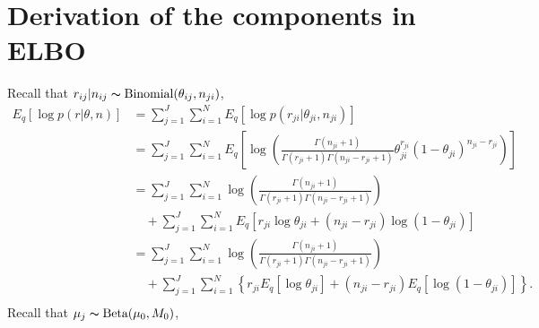 \documentclass[11pt,reqno]{amsart}
\begin{document}
\section{Derivation of the components in ELBO}
\label{appendix:ELBO}
Recall that $r_{ij}|n_{ij}\thicksim \text{Binomial}(\theta_{ij}, n _{ji})$,
\begin{equation}
\begin{split}
E_q \left[ \log p\left(r | \theta, n \right)\right] &= \sum_{j=1}^{J} \sum_{i=1}^{N} E_q  \left[ \log p \left( r_{ji} | \theta_{ji}, n_{ji} \right) \right] \\
&= \sum_{j=1}^{J} \sum_{i=1}^{N}  E_q  \left[ \log \left( \frac{ \Gamma(n_{ji}+1) } { \Gamma(r_{ji}+1) \Gamma( n_{ji} - r_{ji} + 1 ) } \theta_{ji}^{r_{ji}} (1 - \theta_{ji})^{n_{ji} - r_{ji}} \right) \right] \\
&= \sum_{j=1}^{J} \sum_{i=1}^{N} \log \left( \frac{ \Gamma(n_{ji}+1) } { \Gamma(r_{ji}+1) \Gamma( n_{ji} - r_{ji} + 1 ) }\right)  \\
&\quad + \sum_{j=1}^{J} \sum_{i=1}^{N}  E_q  \left[ r_{ji} \log \theta_{ji} + (n_{ji} - r_{ji}) \log (1 - \theta_{ji}) \right] \\
&= \sum_{j=1}^{J} \sum_{i=1}^{N} \log \left( \frac{ \Gamma(n_{ji}+1) } { \Gamma(r_{ji}+1) \Gamma( n_{ji} - r_{ji} + 1 ) }\right)  \\
&\quad + \sum_{j=1}^{J} \sum_{i=1}^{N} \left\lbrace r_{ji} E_q \left[ \log \theta_{ji} \right] + (n_{ji} - r_{ji}) E_q  \left[  \log (1 - \theta_{ji}) \right] \right\rbrace. \\
\end{split}
\end{equation}
Recall that $\mu_j \thicksim \text{Beta}(\mu_0, M_0)$,
\end{document}
